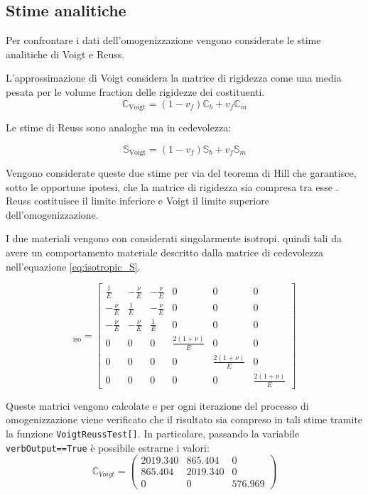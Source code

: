 \documentclass[a4paper,num-refs]{oup-contemporary}
\begin{document}
\subsection{Stime analitiche}

Per confrontare i dati dell'omogenizzazione vengono considerate le stime analitiche di Voigt e Reuss. 

L'approssimazione di Voigt considera la matrice di rigidezza come una media pesata per le volume fraction delle rigidezze dei costituenti. 
\begin{equation}
	\mathbb C_{\operatorname{Voigt}}=(1-v_f)\mathbb C_b+v_f \mathbb C_m
\end{equation}

Le stime di Reuss sono analoghe ma in cedevolezza:

\begin{equation}
	\mathbb S_{\operatorname{Voigt}}=(1-v_f)\mathbb S_b+v_f \mathbb S_m
\end{equation}

Vengono considerate queste due stime per via del teorema di Hill che garantisce, sotto le opportune ipotesi, che la matrice di rigidezza sia compresa tra esse \citep{ABOUDI201387}. Reuss costituisce il limite inferiore e Voigt il limite superiore dell'omogenizzazione. 

I due materiali vengono con considerati singolarmente isotropi, quindi tali da avere un comportamento materiale descritto dalla matrice di cedevolezza  nell'equazione \ref{eq:isotropic_S}.

\begin{equation}
[\mathbb S]_{\operatorname{iso}}=\left[\begin{array}{cccccc}
	\frac{1}{E} & -\frac{\nu}{E} & -\frac{\nu}{E} & 0 & 0 & 0 \\
	-\frac{\nu}{E} & \frac{1}{E} & -\frac{\nu}{E} & 0 & 0 & 0 \\
	-\frac{\nu}{E} & -\frac{\nu}{E} & \frac{1}{E} & 0 & 0 & 0 \\
	0 & 0 & 0 & \frac{2(1+\nu)}{E} & 0 & 0 \\
	0 & 0 & 0 & 0 & \frac{2(1+\nu)}{E} & 0 \\
	0 & 0 & 0 & 0 & 0 & \frac{2(1+\nu)}{E}
\end{array}\right]
\label{eq:isotropic_S}
\end{equation}

Queste matrici vengono calcolate e per ogni iterazione del processo di omogenizzazione viene verificato che il risultato sia compreso in tali stime tramite la funzione \texttt{VoigtReussTest[]}. In particolare, passando la variabile \texttt{verbOutput==True} è possibile estrarne i valori:
\begin{equation}
\mathbb C_{Voigt}=\begin{pmatrix}
	2019.340&865.404&0\\
	865.404&2019.340&0\\
	0&0&576.969
	
\end{pmatrix}
\end{equation}
\end{document}
